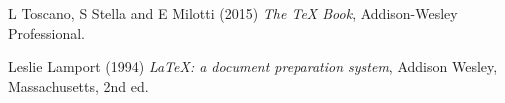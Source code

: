 \begin{thebibliography}{9}
 L Toscano, S Stella and E Milotti  (2015) \emph{The \TeX{} Book}, Addison-Wesley Professional.

Leslie Lamport (1994) \emph{\LaTeX: a document preparation system}, Addison
Wesley, Massachusetts, 2nd ed.
\end{thebibliography}
